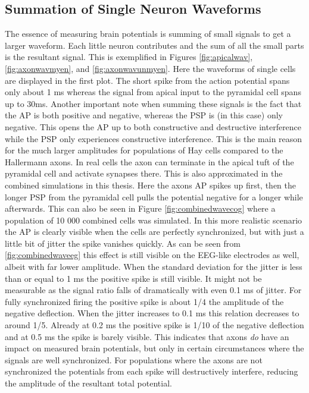 \documentclass[final, a4paper,masters,en,listoffigures,listoftables,norwegiandates]{NMBU}
\begin{document}
\subsection{Summation of Single Neuron Waveforms}
The essence of measuring brain potentials is summing of small signals to get a larger waveform. Each little neuron contributes and the sum of all the small parts is the resultant signal. This is exemplified in Figures \ref{fig:apicalwav}, \ref{fig:axonwavmyen}, and \ref{fig:axonwavunmyen}. Here the waveforms of single cells are displayed in the first plot. The short spike from the action potential spans only about 1 ms whereas the signal from apical input to the pyramidal cell spans up to 30ms. Another important note when summing these signals is the fact that the AP is both positive and negative, whereas the PSP is (in this case) only negative. This opens the AP up to both constructive and destructive interference while the PSP only experiences constructive interference. This is the main reason for the much larger amplitudes for populations of Hay cells compared to the Hallermann axons.
\newline In real cells the axon can terminate in the apical tuft of the pyramidal cell and activate synapses there. This is also approximated in the combined simulations in this thesis. Here the axons AP spikes up first, then the longer PSP from the pyramidal cell pulls the potential negative for a longer while afterwards. This can also be seen in Figure \ref{fig:combinedwavecog} where a population of 10 000 combined cells was simulated. In this more realistic scenario the AP is clearly visible when the cells are perfectly synchronized, but with just a little bit of jitter the spike vanishes quickly. As can be seen from \ref{fig:combinedwaveeg} this effect is still visible on the EEG-like electrodes as well, albeit with far lower amplitude. When the standard deviation for the jitter is less than or equal to 1 ms the positive spike is still visible. It might not be measurable as the signal ratio falls of dramatically with even 0.1 ms of jitter. For fully synchronized firing the positive spike is about 1/4 the amplitude of the negative deflection. When the jitter increases to 0.1 ms this relation decreases to around 1/5. Already at 0.2 ms the positive spike is 1/10 of the negative deflection and at 0.5 ms the spike is barely visible. This indicates that axons \emph{do} have an impact on measured brain potentials, but only in certain circumstances where the signals are well synchronized. For populations where the axons are not synchronized the potentials from each spike will destructively interfere, reducing the amplitude of the resultant total potential. 
\end{document}
